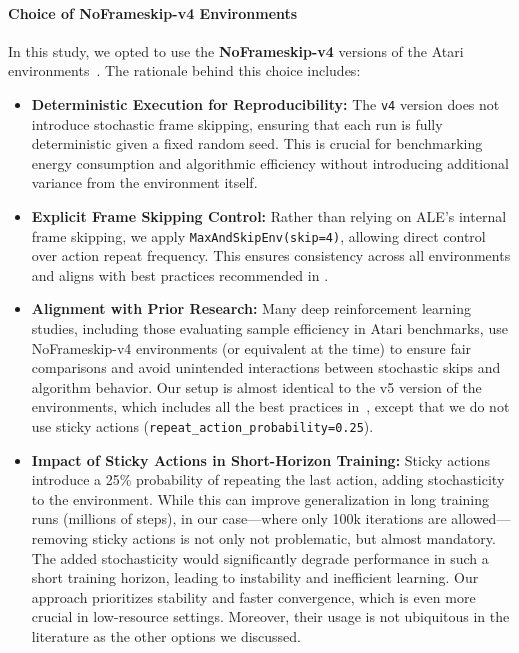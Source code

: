 \paragraph{Choice of NoFrameskip-v4 Environments}
In this study, we opted to use the \textbf{NoFrameskip-v4} versions of the Atari environments~\cite{farama:ale}. The rationale behind this choice includes:

\begin{itemize}
	\item \textbf{Deterministic Execution for Reproducibility:} The \texttt{v4} version does not introduce stochastic frame skipping, ensuring that each run is fully deterministic given a fixed random seed. This is crucial for benchmarking energy consumption and algorithmic efficiency without introducing additional variance from the environment itself.
	\item \textbf{Explicit Frame Skipping Control:} Rather than relying on ALE's internal frame skipping, we apply \texttt{MaxAndSkipEnv(skip=4)}, allowing direct control over action repeat frequency. This ensures consistency across all environments and aligns with best practices recommended in \cite{machado:revisiting_ale}.
	\item \textbf{Alignment with Prior Research:} Many deep reinforcement learning studies, including those evaluating sample efficiency in Atari benchmarks, use NoFrameskip-v4 environments (or equivalent at the time) to ensure fair comparisons and avoid unintended interactions between stochastic skips and algorithm behavior. Our setup is almost identical to the v5 version of the environments, which includes all the best practices in~\cite{machado:revisiting_ale}, except that we do not use sticky actions (\texttt{repeat\_action\_probability=0.25}).
	\item \textbf{Impact of Sticky Actions in Short-Horizon Training:} Sticky actions introduce a 25\% probability of repeating the last action, adding stochasticity to the environment. While this can improve generalization in long training runs (millions of steps), in our case—where only 100k iterations are allowed—removing sticky actions is not only not problematic, but almost mandatory. The added stochasticity would significantly degrade performance in such a short training horizon, leading to instability and inefficient learning. Our approach prioritizes stability and faster convergence, which is even more crucial in low-resource settings. Moreover, their usage is not ubiquitous in the literature as the other options we discussed.
\end{itemize}

